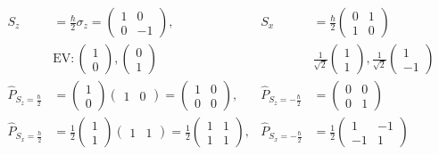 		\begin{align*}
			S_z &= \frac{\hbar}{2} \sigma_z =
			\begin{pmatrix}
				1 & 0 \\
				0 & -1
			\end{pmatrix} ,&
			S_x &= \frac{\hbar}{2} 
			\begin{pmatrix}
				0 & 1 \\
				1 & 0 
			\end{pmatrix} \\
			&\text{EV} : 
			\begin{pmatrix}
			1 \\
			0 
			\end{pmatrix},
			\begin{pmatrix}
			0 \\
			1
			\end{pmatrix} 
			& &\frac{1}{\sqrt{2}}
			\begin{pmatrix}
			1 \\
			1 
			\end{pmatrix} ,
			\frac{1}{\sqrt{2}}
			\begin{pmatrix}
			1 \\
			-1
			\end{pmatrix} \\
			\hat{P}_{S_z = \frac{\hbar}{2}} &=
			\begin{pmatrix}
			1 \\
			0
			\end{pmatrix} 
			\begin{pmatrix}
			1 & 0
			\end{pmatrix} =
			\begin{pmatrix}
			1 & 0 \\
			0 & 0
			\end{pmatrix}, &
			\hat{P}_{S_z = -\frac{\hbar}{2}} &= 
			\begin{pmatrix}
				0 & 0 \\
				0 & 1
			\end{pmatrix} \\
			\hat{P}_{S_x = \frac{\hbar}{2}} &= 
			\frac{1}{2} 
			\begin{pmatrix}
				1 \\
				1
			\end{pmatrix} 
			\begin{pmatrix}
			1 & 1
			\end{pmatrix}
			= \frac{1}{2} 
			\begin{pmatrix}
			1 & 1 \\
			1 & 1
			\end{pmatrix}, &
			\hat{P}_{S_x = -\frac{\hbar}{2}} &=
			\frac{1}{2} 
			\begin{pmatrix}
				1 & - 1 \\
				-1 & 1 
			\end{pmatrix}
		\end{align*}
